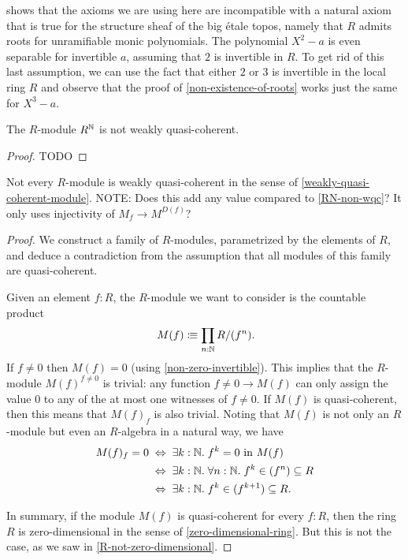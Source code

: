 \begin{remark}
   shows that
  the axioms we are using here
  are incompatible with a natural axiom that is true
  for the structure sheaf of the big étale topos,
  namely that $R$ admits roots for unramifiable monic polynomials.
  The polynomial $X^2 - a$ is even separable for invertible $a$,
  assuming that $2$ is invertible in $R$.
  To get rid of this last assumption,
  we can use the fact that either $2$ or $3$ is invertible in the local ring $R$
  and observe that the proof of \cref{non-existence-of-roots}
  works just the same for $X^3 - a$.
\end{remark}

\begin{proposition}[using ???]%
  \label{RN-non-wqc}
  The $R$-module $R^{\mathbb{N}}$ is not weakly quasi-coherent.
\end{proposition}

\begin{proof}
  TODO
\end{proof}

\begin{proposition}%
  \label{non-wqc-module-family}
  Not every $R$-module is weakly quasi-coherent
  in the sense of \cref{weakly-quasi-coherent-module}.
  {\color{red} NOTE: Does this add any value compared to \cref{RN-non-wqc}?
  It only uses injectivity of $M_f \to M^{D(f)}$?}
\end{proposition}

\begin{proof}
  We construct a family of $R$-modules,
  parametrized by the elements of $R$,
  and deduce a contradiction from the assumption that
  all modules of this family are quasi-coherent.

  Given an element $f : R$,
  the $R$-module we want to consider is
  the countable product
  \[ M(f) \colonequiv \prod_{n : \N} R/(f^n) \rlap{.} \]
  If $f \neq 0$ then $M(f) = 0$
  (using \cref{non-zero-invertible}).
  This implies that the $R$-module $M(f)^{f \neq 0}$
  is trivial:
  any function $f \neq 0 \to M(f)$ can only assign the value $0$
  to any of the at most one witnesses of $f \neq 0$.
  If $M(f)$ is quasi-coherent,
  then this means that $M(f)_f$ is also trivial.
  Noting that
  $M(f)$ is not only an $R$-module
  but even an $R$-algebra in a natural way,
  we have
  \begin{align*}
    M(f)_f = 0
    &\;\Leftrightarrow\;
    \exists k : \N.\; \text{$f^k = 0$ in $M(f)$} \\
    &\;\Leftrightarrow\;
    \exists k : \N.\; \forall n : \N.\; f^k \in (f^n) \subseteq R \\
    &\;\Leftrightarrow\;
    \exists k : \N.\; f^k \in (f^{k + 1}) \subseteq R
    \rlap{.}
  \end{align*}

  In summary,
  if the module $M(f)$ is quasi-coherent
  for every $f : R$,
  then the ring $R$ is zero-dimensional
  in the sense of \cref{zero-dimensional-ring}.
  But this is not the case,
  as we saw in \cref{R-not-zero-dimensional}.
\end{proof}
